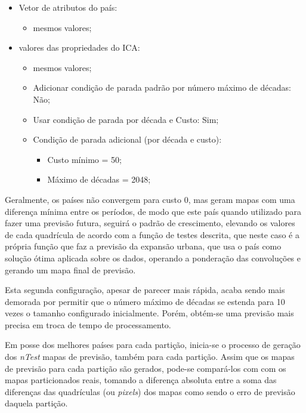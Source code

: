 \begin{itemize}
\item Vetor de atributos do país:

	\begin{itemize}
	\item mesmos valores;
	\end{itemize}

\item valores das propriedades do ICA:

	\begin{itemize}
	\item mesmos valores;
	\item Adicionar condição de parada 	padrão por número máximo de décadas: Não; 
	\item Usar condição de parada por década e Custo: Sim;
	\item Condição de parada adicional (por década e custo):

		\begin{itemize}
		\item Custo mínimo = 50;
		\item Máximo de décadas = 2048;
		\end{itemize}

	\end{itemize}

\end{itemize}

Geralmente, os países não convergem para custo 0, mas geram mapas com uma diferença mínima entre os períodos, de modo que este país quando utilizado para fazer uma previsão futura, seguirá o padrão de crescimento, elevando os valores de cada quadrícula de acordo com a função de testes descrita, que neste caso é a própria função que faz a previsão da expansão urbana, que usa o país como solução ótima aplicada sobre os dados, operando a ponderação das convoluções e gerando um mapa final de previsão.

Esta segunda configuração, apesar de parecer mais rápida, acaba sendo mais demorada por permitir que o número máximo de décadas se estenda para 10 vezes o tamanho configurado inicialmente. Porém, obtém-se uma previsão mais precisa em troca de tempo de processamento.

Em posse dos melhores países para cada partição, inicia-se o processo de geração dos \emph{nTest} mapas de previsão, também para cada partição. Assim que os mapas de previsão para cada partição são gerados, pode-se compará-los com com os mapas particionados reais, tomando a diferença absoluta entre a soma das diferenças das quadrículas (ou \emph{pixels}) dos mapas como sendo o erro de previsão daquela partição. 

